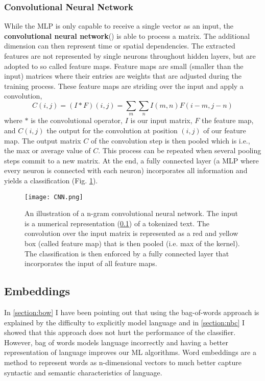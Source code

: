 \subsubsection{Convolutional Neural Network}
While the MLP is only capable to receive a single vector as an input, the \textbf{convolutional neural network}() is able to process a matrix. The additional dimension can then represent time or spatial dependencies. The extracted features are not represented by single neurons throughout hidden layers, but are adopted to so called feature maps. Feature maps are small (smaller than the input) matrices where their entries are weights that are adjusted during the training process. These feature maps are striding over the input and apply a convolution,
\[C(i,j) = (I \ast F)(i,j) = \sum_m \sum_n I(m, n) F(i-m, j-n)\] where $\ast$ is the convolutional operator, $I$ is our input matrix, $F$ the feature map, and $C(i,j)$ the output for the convolution at position $(i,j)$ of our feature map. The output matrix $C$ of the convolution step is then pooled which is i.e., the max or average value of $C$. This process can be repeated when several pooling steps commit to a new matrix. At the end, a fully connected layer (a MLP where every neuron is connected with each neuron) incorporates all information and yields a classification (Fig. \ref{fig:cnn}).
\begin{figure}[h!]
    \centering
    \texttt{[image: CNN.png]}
    \caption{An illustration of a n-gram convolutional neural network. The input is a numerical representation (\ref{section:embeddings}) of a tokenized text. The convolution over the input matrix is represented as a red and yellow box (called feature map) that is then pooled (i.e. max of the kernel). The classification is then enforced by a fully connected layer that incorporates the input of all feature maps.}
    \label{fig:cnn}
\end{figure}


\subsection{Embeddings}\label{section:embeddings}
In \ref{section:bow} I have been pointing out that using the bag-of-words approach is explained by the difficulty to explicitly model language and in \ref{section:nbc} I showed that this approach does not hurt the performance of the classifier. However, bag of words models language incorrectly and having a better representation of language improves our ML algorithms. Word embeddings are a method to represent words as n-dimensional vectors to much better capture syntactic and semantic characteristics of language.

